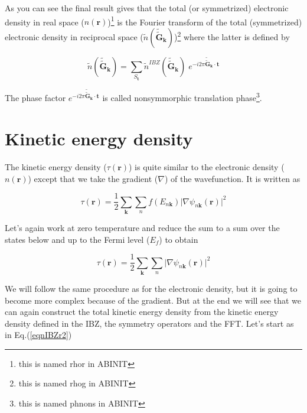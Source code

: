 \documentclass[a4paper,12pt]{report}
\begin{document}
As you can see the final result gives that the total (or symmetrized) electronic density in real space ($n(\mathbf{r})$)\footnote{this is named rhor in ABINIT} is the Fourier transform of the total (symmetrized) electronic density in reciprocal space ($\tilde{n}(\tilde{\tilde{\mathbf{G}}}_{\mathbf{k}})$)\footnote{this is named rhog in ABINIT} where the latter is defined by

\begin{equation}
\tilde{n}(\tilde{\tilde{\mathbf{G}}}_{\mathbf{k}}) = \sum_{S_{\mathbf{t}}} \tilde{n}^{IBZ}(\tilde{\tilde{\mathbf{G}}}_{\mathbf{k}})\; e^{-i2\pi \tilde{\tilde{\mathbf{G}}}_{\mathbf{k}} \cdot \mathbf{t}}
\end{equation}

The phase factor $e^{-i2\pi \tilde{\tilde{\mathbf{G}}}_{\mathbf{k}} \cdot \mathbf{t}}$ is called nonsymmorphic translation phase\footnote{this is named phnons in ABINIT}.

\section{Kinetic energy density}
\label{section2_2}

The kinetic energy density ($\tau(\mathbf{r})$) is quite similar to the electronic density ($n(\mathbf{r})$) except that we take the gradient ($\nabla$) of the wavefunction. It is written as

\begin{equation}
\tau(\mathbf{r}) = \frac{1}{2} \sum_{\mathbf{k}} \sum_n f(E_{n\mathbf{k}}) \vert \nabla \psi_{n\mathbf{k}}(\mathbf{r}) \vert^2
\end{equation}

Let's again work at zero temperature and reduce the sum to a sum over the states below and up to the Fermi level ($E_f$) to obtain

\begin{equation}
\tau(\mathbf{r}) = \frac{1}{2} \sum_{\mathbf{k}} \sum_n \vert \nabla \psi_{n\mathbf{k}}(\mathbf{r}) \vert^2
\label{eqdefkden}
\end{equation}

We will follow the same procedure as for the electronic density, but it is going to become more complex because of the gradient. But at the end we will see that we can again construct the total kinetic energy density from the kinetic energy density defined in the IBZ, the symmetry operators and the FFT. Let's start as in Eq.(\ref{eqnIBZr2})
\end{document}
